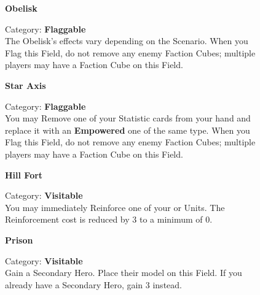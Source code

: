 \begin{figure}[H]
  \begin{minipage}[t]{0.47\textwidth}
    \vspace{0pt}
    \centering
    \phantom{j}\textbf{Obelisk}\par
    \caption{\small Category: \textbf{Flaggable}\\
      The Obelisk's effects vary depending on the Scenario.
      When you Flag this Field, do not remove any enemy Faction Cubes; multiple players may have a Faction Cube on this Field.}
  \end{minipage}\hfill
  \begin{minipage}[t]{0.47\textwidth}
    \vspace{0pt}
    \centering
    \phantom{j}\textbf{Star Axis}\par
    \caption{\small Category: \textbf{Flaggable}\\
      You may Remove one of your Statistic cards from your hand and replace it with an \textbf{Empowered} one of the same type.
      When you Flag this Field, do not remove any enemy Faction Cubes; multiple players may have a Faction Cube on this Field.}
  \end{minipage}
\end{figure}

\begin{figure}[H]
  \begin{minipage}[t]{0.47\textwidth}
    \vspace{0pt}
    \centering
    \phantom{j}\textbf{Hill Fort}\par
    \caption{\small Category: \textbf{Visitable}\\
      You may immediately Reinforce one of your  or  Units.
      The Reinforcement cost is reduced by 3  to a minimum of 0.}
  \end{minipage}\hfill
  \begin{minipage}[t]{0.47\textwidth}
    \vspace{0pt}
    \centering
    \phantom{j}\textbf{Prison}\par
    \caption{\small Category: \textbf{Visitable}\\
      Gain a Secondary Hero.
      Place their model on this Field.
      If you already have a Secondary Hero, gain 3  instead.}
  \end{minipage}
\end{figure}

